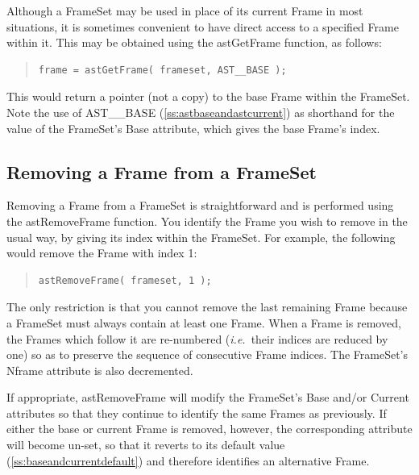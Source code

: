 \documentclass[twoside,11pt]{article}
\newcommand{\htmlref}[2]{#1}
\newcommand{\secref}[1]{\S\ref{#1}}
\renewcommand{\secref}[1]{\ref{#1}}
\begin{document}
Although a \htmlref{FrameSet}{FrameSet} may be used in place of its current \htmlref{Frame}{Frame} in most
situations, it is sometimes convenient to have direct access to a
specified Frame within it. This may be obtained using the \htmlref{astGetFrame}{astGetFrame}
function, as follows:

\begin{quote}
\small
\begin{verbatim}
frame = astGetFrame( frameset, AST__BASE );
\end{verbatim}
\normalsize
\end{quote}

This would return a pointer (not a copy) to the base Frame within the
FrameSet. Note the use of AST\_\_BASE
(\secref{ss:astbaseandastcurrent}) as shorthand for the value of the
FrameSet's \htmlref{Base}{Base} attribute, which gives the base Frame's index.

\subsection{Removing a Frame from a FrameSet}

Removing a \htmlref{Frame}{Frame} from a \htmlref{FrameSet}{FrameSet} is straightforward and is performed
using the \htmlref{astRemoveFrame}{astRemoveFrame} function. You identify the Frame you wish to
remove in the usual way, by giving its index within the FrameSet. For
example, the following would remove the Frame with index 1:

\begin{quote}
\small
\begin{verbatim}
astRemoveFrame( frameset, 1 );
\end{verbatim}
\normalsize
\end{quote}

The only restriction is that you cannot remove the last remaining
Frame because a FrameSet must always contain at least one Frame.  When
a Frame is removed, the Frames which follow it are re-numbered
({\em{i.e.}}\ their indices are reduced by one) so as to preserve the
sequence of consecutive Frame indices.  The FrameSet's \htmlref{Nframe}{Nframe}
attribute is also decremented.

If appropriate, astRemoveFrame will modify the FrameSet's \htmlref{Base}{Base} and/or
\htmlref{Current}{Current} attributes so that they continue to identify the same Frames
as previously. If either the base or current Frame is removed,
however, the corresponding attribute will become un-set, so that it
reverts to its default value (\secref{ss:baseandcurrentdefault}) and
therefore identifies an alternative Frame.
\end{document}
